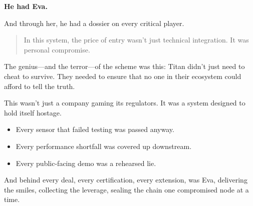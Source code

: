 \textbf{He had Eva.}

And through her,
he had a dossier on every critical player.

\begin{quote}
In this system, the price of entry wasn’t just technical integration.
It was personal compromise.
\end{quote}

The genius—and the terror—of the scheme was this: Titan didn’t just need to cheat to survive.  They needed to ensure that no one in their ecosystem could afford to tell the truth.

This wasn’t just a company gaming its regulators.  It was a system designed to hold itself hostage.

\begin{itemize}
\item Every sensor that failed testing was passed anyway.
\item Every performance shortfall was covered up downstream.
\item Every public-facing demo was a rehearsed lie.
\end{itemize}

And behind every deal,
every certification,
every extension,
was Eva,
delivering the smiles,
collecting the leverage,
sealing the chain one compromised node at a time.

